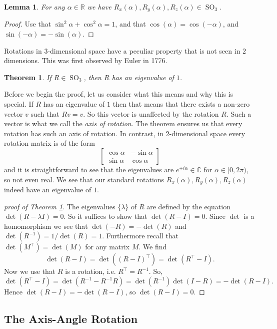 \documentclass{article}
\newtheorem{lemma}[definition]{Lemma}
\newtheorem{theorem}[definition]{Theorem}
\DeclareMathOperator{\SO}{SO}
\begin{document}
\begin{lemma}
For any $\alpha \in \mathbb{R}$ we have $R_x(\alpha), R_y(\alpha), R_z(\alpha) \in \SO_3$.
\end{lemma}
\begin{proof}
Use that $\sin^2 \alpha + \cos^2 \alpha = 1$, and that $\cos(\alpha) = \cos(-\alpha)$, and $\sin(-\alpha) = -\sin(\alpha)$.
\end{proof}
Rotations in $3$-dimensional space have a peculiar property that is not seen in $2$ dimensions. This was first observed by Euler in 1776.
\begin{theorem} \label{thm:eulerrot}
If $R \in \SO_3$, then $R$ has an eigenvalue of $1$.
\end{theorem}
Before we begin the proof, let us consider what this means and why this is special. If $R$ has an eigenvalue of $1$ then that means that there exists a non-zero vector $v$ such that $Rv = v$. So this vector is unaffected by the rotation $R$. Such a vector is what we call the \emph{axis of rotation}. The theorem ensures us that every rotation has such an axis of rotation. In contrast, in $2$-dimensional space every rotation matrix is of the form
\[ \begin{bmatrix} \cos \alpha & -\sin \alpha \\ \sin \alpha & \cos \alpha \end{bmatrix} \]
and it is straightforward to see that the eigenvalues are $e^{\pm i\alpha} \in \mathbb{C}$ for $\alpha \in [0, 2 \pi)$, so not even real. We see that our standard rotations $R_x(\alpha), R_y(\alpha), R_z(\alpha)$ indeed have an eigenvalue of $1$.

\begin{proof}[proof of Theorem \ref{thm:eulerrot}]
The eigenvalues $\{\lambda\}$ of $R$ are defined by the equation $\det(R - \lambda I) = 0$. So it suffices to show that $\det(R-I) = 0$. Since $\det$ is a homomorphism we see that $\det(-R) = -\det(R)$ and $\det(R^{-1}) = 1/\det(R) = 1$. Furthermore recall that $\det(M^\intercal) = \det(M)$ for any matrix $M$. We find
\[ \det(R-I) = \det\left((R-I)^\intercal\right) = \det \left(R^\intercal - I\right). \]
Now we use that $R$ is a rotation, i.e. $R^\intercal = R^{-1}$. So,
\[ \det \left(R^\intercal - I\right) = \det \left( R^{-1} - R^{-1}R \right) = \det \left( R^{-1} \right) \det \left(I-R\right) = -\det(R-I). \]
Hence $\det(R-I) = -\det(R-I)$, so $\det(R-I) = 0$.
\end{proof}

\subsection{The Axis-Angle Rotation}
\end{document}
